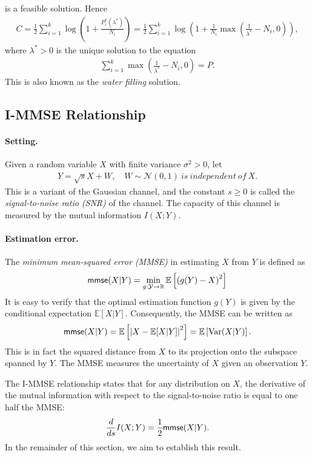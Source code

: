 \documentclass{article}
\numberwithin{equation}{section}
\newcommand{\E}{\mathbb{E}}
\newcommand{\bbR}{\mathbb{R}}
\renewcommand{\cal}{\mathcal}
\DeclareMathOperator{\var}{Var}
\theoremstyle{plain}
\theoremstyle{definition}
\begin{document}
is a feasible solution. Hence
\begin{align*}
	C=\frac{1}{2}\sum_{i=1}^k\log\left(1+\frac{P_i^*(\lambda^*)}{N_i}\right)=\frac{1}{2}\sum_{i=1}^k\log\left(1+\frac{1}{N_i}\max\left(\frac{1}{\lambda^*}-N_i, 0\right)\right),
\end{align*}
where $\lambda^*>0$ is the unique solution to the equation
\begin{align*}
	\sum_{i=1}^k\max\left(\frac{1}{\lambda^*}-N_i, 0\right)=P.
\end{align*}
This is also known as the \textit{water filling} solution.

\newpage
\subsection{I-MMSE Relationship}
\paragraph{Setting.} Given a random variable $X$ with finite variance $\sigma^2>0$, let
\begin{align*}
	Y=\sqrt{s}X+W,\quad W\sim\cal{N}(0,1)\ is\ independent\ of\ X.
\end{align*}
This is a variant of the Gaussian channel, and the constant $s\geq 0$ is called the \textit{signal-to-noise ratio (SNR)} of the channel. The capacity of this channel is measured by the mutual information $I(X;Y)$.

\paragraph{Estimation error.} The \textit{minimum mean-squared error (MMSE)} in estimating $X$ from $Y$ is defined as
\begin{align*}
	{\sf mmse}(X|Y)=\min_{g:\cal{Y}\to\bbR}\E\left[\left(g(Y)-X\right)^2\right]
\end{align*}
It is easy to verify that the optimal estimation function $g(Y)$ is given by the conditional expectation $\E[X|Y]$. Consequently, the MMSE can be written as
\begin{align*}
	{\sf mmse}(X|Y)=\E\left[\left\vert X-\E[X|Y]\right\vert^2\right]=\E\left[\var(X|Y)\right].
\end{align*}
This is in fact the squared distance from $X$ to its projection onto the subspace spanned by $Y$. The MMSE measures the uncertainty of $X$ given an observation $Y$.

The I-MMSE relationship states that for any distribution on $X$, the derivative of the mutual information with respect to the signal-to-noise ratio is equal to one half the MMSE:
\begin{align*}
	\frac{d}{ds}I(X;Y)=\frac{1}{2}{\sf mmse}(X|Y).
\end{align*}
In the remainder of this section, we aim to establish this result.
\end{document}
